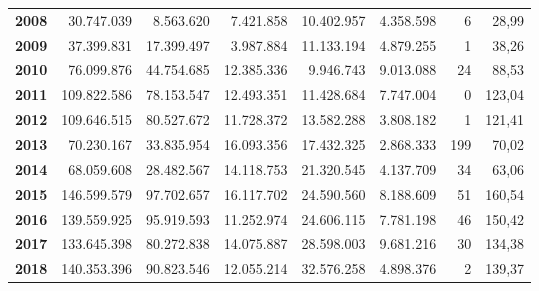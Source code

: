 \begin{table}[h!]
\begin{adjustbox}{width=1.5\textwidth, center}
\begin{tabular}{|l|r|r|r|r|r|r|r|}
            \textbf{2008}       & 30.747.039            & 8.563.620             & 7.421.858                 & 10.402.957            & 4.358.598                 & 6             & 28,99         \\
            \textbf{2009}       & 37.399.831            & 17.399.497            & 3.987.884                 & 11.133.194            & 4.879.255                 & 1             & 38,26         \\
            \textbf{2010}       & 76.099.876            & 44.754.685            & 12.385.336                & 9.946.743             & 9.013.088                 & 24            & 88,53         \\
            \textbf{2011}       & 109.822.586           & 78.153.547            & 12.493.351                & 11.428.684            & 7.747.004                 & 0             & 123,04        \\
            \midrule
            \textbf{2012}       & 109.646.515           & 80.527.672            & 11.728.372                & 13.582.288            & 3.808.182                 & 1             & 121,41        \\
            \textbf{2013}       & 70.230.167            & 33.835.954            & 16.093.356                & 17.432.325            & 2.868.333                 & 199           & 70,02         \\
            \textbf{2014}       & 68.059.608            & 28.482.567            & 14.118.753                & 21.320.545            & 4.137.709                 & 34            & 63,06         \\
            \textbf{2015}       & 146.599.579           & 97.702.657            & 16.117.702                & 24.590.560            & 8.188.609                 & 51            & 160,54        \\
            \textbf{2016}       & 139.559.925           & 95.919.593            & 11.252.974                & 24.606.115            & 7.781.198                 & 46            & 150,42        \\
            \textbf{2017}       & 133.645.398           & 80.272.838            & 14.075.887                & 28.598.003            & 9.681.216                 & 30            & 134,38        \\
            \midrule
            \textbf{2018}       & 140.353.396           & 90.823.546            & 12.055.214                & 32.576.258            & 4.898.376                 & 2             & 139,37        \\

\end{tabular}
\end{adjustbox}
\end{table}
